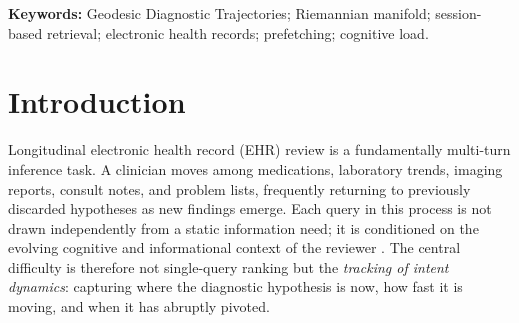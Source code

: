\documentclass[11pt]{article}
\begin{document}
\begin{abstract}
\textbf{Results.} In the pooled four-arm crossover (30 to 3{,}000 sessions per condition), GDT reduced time-to-correct-information by 23.2\% (58.4~s vs.\ 76.1~s), query latency by 32.2\%, and simulated cognitive load by 24.8\% relative to the TF-IDF control, while improving completion from 94.7\% to 99.4\%, with stable gains (16--24\%) across the scaling study and a mixed-effects estimate of a 20.1\% reduction (95\% CI 19.6--20.7\%, $p<0.001$). In simulation-based validation, simulation-derived proxies showed SUS improved from 63.1 to 82.3 ($p<0.001$), human time-on-task fell by 13.9\%, and premature-closure events in seeded high-acuity handover scenarios fell from 8/12 to 3/12 ($p=0.04$). An $\text{M/M}/c$ model of the ED decision queue shows that the 23.2\% chart-review reduction propagates to a 62.6\% reduction in queueing wait and a 42.4\% reduction in total time in system at 83\% utilization, raising bed-turnover throughput by 73.5\%.

\textbf{Conclusions.} GDT provides a unified mathematical and operational account of adaptive decision support: geometric tracking of diagnostic intent, provable bounds on context contamination, and a direct quantitative link from retrieval efficiency to hospital throughput, cognitive-error reduction, and clinical safety.
\end{abstract}

\vspace{0.5em}
\noindent\textbf{Keywords:} Geodesic Diagnostic Trajectories; Riemannian manifold; session-based retrieval; electronic health records; prefetching; cognitive load.

\section{Introduction}
\label{sec:intro}

Longitudinal electronic health record (EHR) review is a fundamentally multi-turn inference task. A clinician moves among medications, laboratory trends, imaging reports, consult notes, and problem lists, frequently returning to previously discarded hypotheses as new findings emerge. Each query in this process is not drawn independently from a static information need; it is conditioned on the evolving cognitive and informational context of the reviewer \citep{zamani20}. The central difficulty is therefore not single-query ranking but the \emph{tracking of intent dynamics}: capturing where the diagnostic hypothesis is now, how fast it is moving, and when it has abruptly pivoted.
\end{document}
